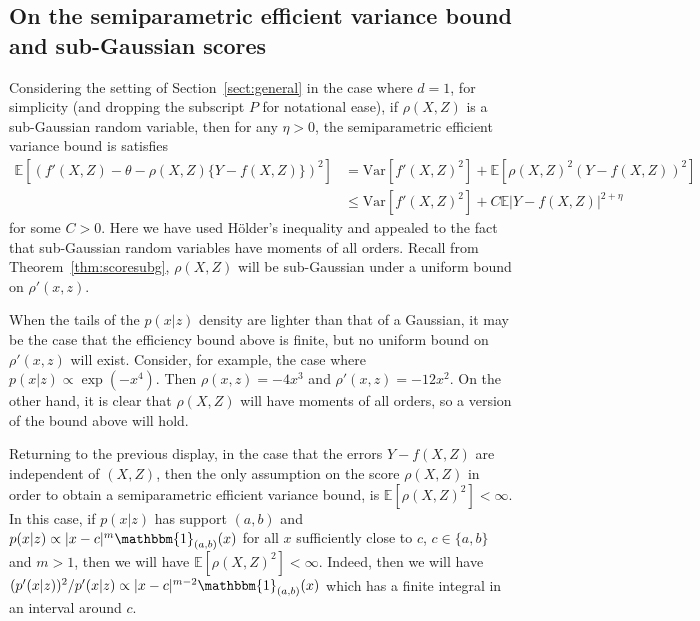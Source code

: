 \documentclass[aos]{imsart}
\newcommand{\ind}{\mathbbm{1}}
\newcommand{\E}{\mathbb{E}}
\newcommand{\Var}{\mathrm{Var}}
\begin{document}
	\subsection{On the semiparametric efficient variance bound and sub-Gaussian scores} \label{sec:var_bound}
	Considering the setting of Section~\ref{sect:general} in the case where $d=1$, for simplicity (and dropping the subscript $P$ for notational ease), if $\rho(X, Z)$ is a sub-Gaussian random variable, then for any $\eta > 0$, the semiparametric efficient variance bound is satisfies
	\begin{align*}
		\E\left[\left(f'(X, Z) - \theta - \rho(X, Z)\{Y - f(X, Z)\}\right)^2 \right] &= \Var[f'(X, Z)^2] + \E \left[ \rho(X, Z)^2(Y - f(X, Z))^2\right] \\
		&\leq \Var[f'(X, Z)^2] + C \E|Y - f(X, Z)|^{2+\eta}
	\end{align*}
	for some $C > 0$. Here we have used H\"older's inequality and appealed to the fact that sub-Gaussian random variables have moments of all orders. Recall from Theorem~\ref{thm:scoresubg}, $\rho(X, Z)$ will be sub-Gaussian under a uniform bound on $\rho'(x, z)$.
	
	When the tails of the $p(x|z)$ density are lighter than that of a Gaussian, it may be the case that the efficiency bound above is finite, but no uniform bound on $\rho'(x, z)$ will exist. Consider, for example, the case where $p(x|z) \propto \exp(-x^{4})$. Then $\rho(x, z) = -4x^3$ and $\rho'(x, z) = -12 x^2$. On the other hand, it is clear that $\rho(X, Z)$ will have moments of all orders, so a version of the bound above will hold.
	
	Returning to the previous display, in the case that the errors $Y - f(X, Z)$ are independent of $(X, Z)$, then the only assumption on the score $\rho(X, Z)$ in order to obtain a semiparametric efficient variance bound, is $\E[\rho(X, Z)^2] < \infty$. In this case, if $p(x|z)$ has support $(a, b)$ and $p(x|z) \propto |x-c|^m \ind_{(a, b)}(x)$ for all $x$ sufficiently close to $c$, $c \in \{a,b\}$ and $m > 1$, then we will have $\E[\rho(X, Z)^2] < \infty$. Indeed, then we will have $(p'(x|z))^2 / p'(x|z) \propto |x-c|^{m-2}\ind_{(a, b)}(x)$ which has a finite integral in an interval around $c$.
	
	
	
\end{document}
